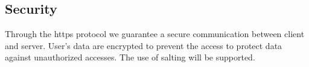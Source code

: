 \subsection{Security}
Through the https protocol we guarantee a secure communication between client and server.
User’s data are encrypted to prevent the access to protect data against unauthorized accesses. The use of salting will be supported.
